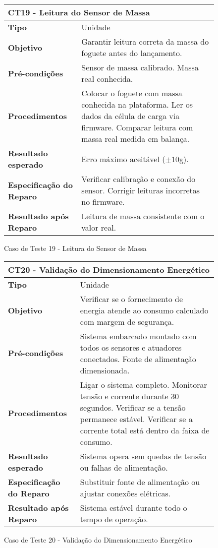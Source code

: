 \begin{figure}[H]
    \centering
\begin{longtable}{|p{}|p{}|}
\hline
\multicolumn{2}{|l|}{\textbf{CT19 - Leitura do Sensor de Massa}} \\
\hline
\textbf{Tipo} & Unidade \\
\hline
\textbf{Objetivo} & Garantir leitura correta da massa do foguete antes do lançamento. \\
\hline
\textbf{Pré-condições} &  Sensor de massa calibrado.  Massa real conhecida.  \\
\hline
\textbf{Procedimentos} &  Colocar o foguete com massa conhecida na plataforma.  Ler os dados da célula de carga via firmware.  Comparar leitura com massa real medida em balança.  \\
\hline
\textbf{Resultado esperado} & Erro máximo aceitável ($\pm 10$g). \\
\hline
\textbf{Especificação do Reparo} & Verificar calibração e conexão do sensor. Corrigir leituras incorretas no firmware. \\
\hline
\textbf{Resultado após Reparo} & Leitura de massa consistente com o valor real. \\
\hline
\end{longtable}
\caption{Caso de Teste 19 - Leitura do Sensor de Massa}
\label{fig_ct16_leitura_sensor_massa}
\end{figure}

\begin{figure}[H]
    \centering
\begin{longtable}{|p{}|p{}|}
\hline
\multicolumn{2}{|l|}{\textbf{CT20 - Validação do Dimensionamento Energético}} \\
\hline
\textbf{Tipo} & Unidade \\
\hline
\textbf{Objetivo} & Verificar se o fornecimento de energia atende ao consumo calculado com margem de segurança. \\
\hline
\textbf{Pré-condições} &  Sistema embarcado montado com todos os sensores e atuadores conectados.  Fonte de alimentação dimensionada.  \\
\hline
\textbf{Procedimentos} &  Ligar o sistema completo.  Monitorar tensão e corrente durante 30 segundos.  Verificar se a tensão permanece estável.  Verificar se a corrente total está dentro da faixa de consumo.  \\
\hline
\textbf{Resultado esperado} & Sistema opera sem quedas de tensão ou falhas de alimentação. \\
\hline
\textbf{Especificação do Reparo} & Substituir fonte de alimentação ou ajustar conexões elétricas. \\
\hline
\textbf{Resultado após Reparo} & Sistema estável durante todo o tempo de operação. \\
\hline
\end{longtable}
\caption{Caso de Teste 20 - Validação do Dimensionamento Energético}
\label{fig_ct17_validacao_dimensionamento_energetico}
\end{figure}

